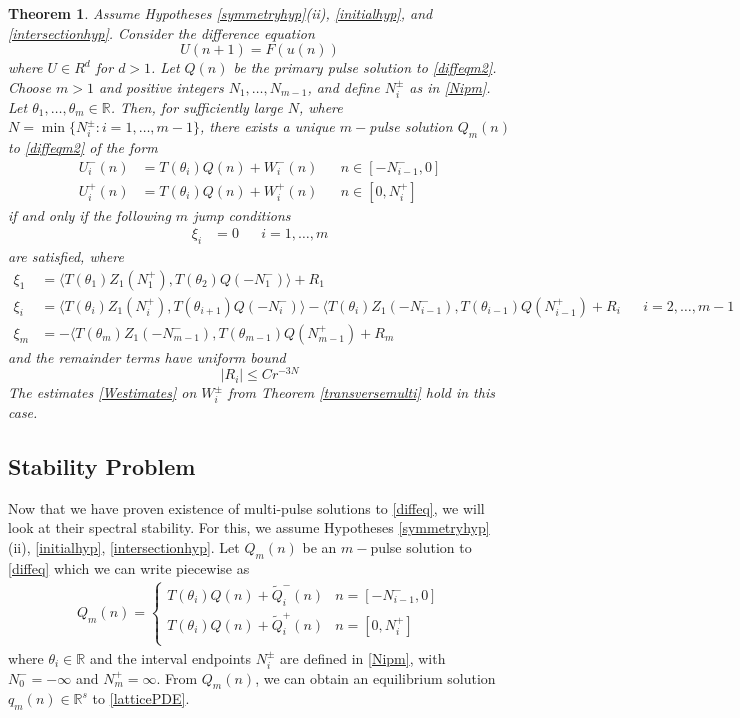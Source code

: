 \documentclass[12pt]{article}
\def\R{{\mathbb R}}
\newtheorem{theorem}{Theorem}
\begin{document}
\begin{theorem}\label{ntmulti}
Assume Hypotheses \ref{symmetryhyp}(ii), \ref{initialhyp}, and \ref{intersectionhyp}. Consider the difference equation
\begin{equation}\label{diffeqm2}
U(n+1) = F(u(n))
\end{equation}
where $U \in R^d$ for $d > 1$. Let $Q(n)$ be the primary pulse solution to \eqref{diffeqm2}. Choose $m > 1$ and positive integers $N_1, \dots, N_{m-1}$, and define $N_i^\pm$ as in \eqref{Nipm}. Let $\theta_1, \dots, \theta_m \in \R$. Then, for sufficiently large $N$, where $N = \min\{ N_i^\pm : i = 1, \dots, m-1 \}$, there exists a unique $m-$pulse solution $Q_m(n)$ to \eqref{diffeqm2} of the form
\begin{align}
U_i^-(n) &= T(\theta_i) Q(n) + W_i^-(n) && n \in [-N_{i-1}^-, 0] \\
U_i^+(n) &= T(\theta_i) Q(n) + W_i^+(n) && n \in [0, N_i^+]
\end{align}
if and only if the following $m$ jump conditions 
\begin{align*}
\xi_i &= 0 && i = 1, \dots, m
\end{align*}
are satisfied, where
\begin{equation}\label{jumpZ}
\begin{aligned}
\xi_1 &= \langle T(\theta_1) Z_1(N_1^+), T(\theta_2) Q(-N_1^-) \rangle + R_1  \\
\xi_i &= \langle T(\theta_i) Z_1(N_i^+), T(\theta_{i+1}) Q(-N_i^-) \rangle
- \langle T(\theta_i) Z_1(-N_{i-1}^-), T(\theta_{i-1}) Q(N_{i-1}^+) + R_i &&
i = 2, \dots, m-1 \\
\xi_m &= -\langle T(\theta_m) Z_1(-N_{m-1}^-), T(\theta_{m-1}) Q(N_{m-1}^+) + R_m
\end{aligned}
\end{equation}
and the remainder terms have uniform bound
\[
|R_i| \leq C r^{-3N}
\]
The estimates \eqref{Westimates} on $W_i^\pm$ from Theorem \ref{transversemulti} hold in this case.
\end{theorem}

\subsection{Stability Problem}

Now that we have proven existence of multi-pulse solutions to \eqref{diffeq}, we will look at their spectral stability. For this, we assume Hypotheses \ref{symmetryhyp}(ii), \ref{initialhyp}, \ref{intersectionhyp}. Let $Q_m(n)$ be an $m-$pulse solution to \eqref{diffeq} which we can write piecewise as
\begin{align}\label{qmpiecewise}
Q_m(n) =
\begin{cases}
T(\theta_i) Q(n) + \tilde{Q}_i^-(n) & n = [-N_{i-1}^-, 0] \\
T(\theta_i) Q(n) + \tilde{Q}_i^+(n) & n = [0, N_i^+] \\
\end{cases}
\end{align}
where $\theta_i \in \R$ and the interval endpoints $N_i^\pm$ are defined in \eqref{Nipm}, with $N_0^- = -\infty$ and $N_m^+ = \infty$. From $Q_m(n)$, we can obtain an equilibrium solution $q_m(n) \in \R^s$ to \eqref{latticePDE}. 
\end{document}

